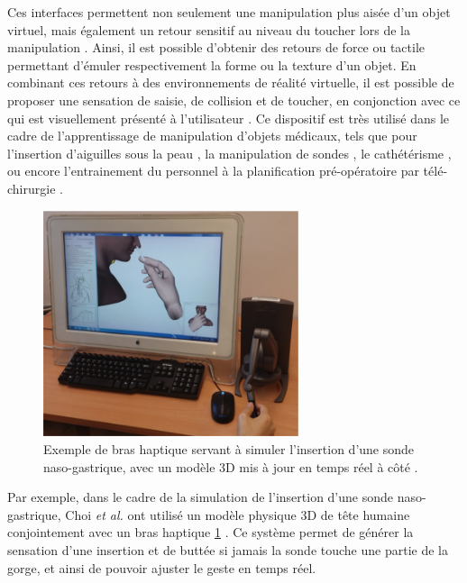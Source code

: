 Ces interfaces permettent non seulement une manipulation plus aisée d'un objet virtuel, mais également un retour sensitif au niveau du toucher lors de la manipulation \parencite{SREELAKSHMI20174182}. Ainsi, il est possible d'obtenir des retours de force ou tactile permettant d'émuler respectivement la forme ou la texture d'un objet. En combinant ces retours à des environnements de réalité virtuelle, il est possible de proposer une sensation de saisie, de collision et de toucher, en conjonction avec ce qui est visuellement présenté à l'utilisateur \parencite{Whitmire2018}. Ce dispositif est très utilisé dans le cadre de l'apprentissage de manipulation d'objets médicaux, tels que pour l'insertion d'aiguilles sous la peau \parencite{CORREA20196}, la manipulation de sondes \parencite{Choi2015103}, le cathétérisme \parencite{PEPLEY20171066}, ou encore l'entrainement du personnel à la planification pré-opératoire par télé-chirurgie \parencite{HALABI20189}.

\begin{figure}
    \centering
    \includegraphics[width=7.5cm]{pictures/haptic_arm.png}
    \caption[Bras haptique simulant l'insertion d'une sonde naso-gastrique \parencite{Choi2015103}]{Exemple de bras haptique servant à simuler l'insertion d'une sonde naso-gastrique, avec un modèle 3D mis à jour en temps réel à côté \parencite{Choi2015103}.}
    \label{fig:haptic_arm}
\end{figure}

Par exemple, dans le cadre de la simulation de l'insertion d'une sonde naso-gastrique, Choi \textit{et al.} ont utilisé un modèle physique 3D de tête humaine conjointement avec un bras haptique \ref{fig:haptic_arm} \parencite{Choi2015103}. Ce système permet de générer la sensation d'une insertion et de buttée si jamais la sonde touche une partie de la gorge, et ainsi de pouvoir ajuster le geste en temps réel.

